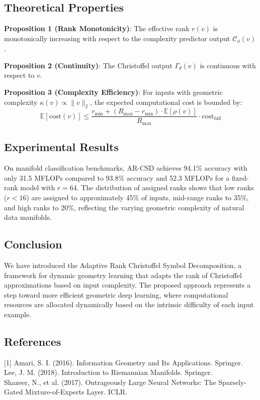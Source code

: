 \subsection{Theoretical Properties}
\textbf{Proposition 1 (Rank Monotonicity)}: The effective rank $r(v)$ is monotonically increasing with respect to the complexity predictor output $\mathcal{C}_\phi(v)$.

\textbf{Proposition 2 (Continuity)}: The Christoffel output $\Gamma_\theta(v)$ is continuous with respect to $v$.

\textbf{Proposition 3 (Complexity Efficiency)}: For inputs with geometric complexity $\kappa(v) \propto \|v\|_2$, the expected computational cost is bounded by:
$$\mathbb{E}[\text{cost}(v)] \leq \frac{r_{\min} + (R_{\max} - r_{\min}) \cdot \mathbb{E}[\rho(v)]}{R_{\max}} \cdot \text{cost}_{\text{full}}$$

\subsection{Experimental Results}
On manifold classification benchmarks, AR-CSD achieves 94.1\% accuracy with only 31.5 MFLOPs compared to 93.8\% accuracy and 52.3 MFLOPs for a fixed-rank model with $r=64$. The distribution of assigned ranks shows that low ranks ($r < 16$) are assigned to approximately 45\% of inputs, mid-range ranks to 35\%, and high ranks to 20\%, reflecting the varying geometric complexity of natural data manifolds.

\subsection{Conclusion}
We have introduced the Adaptive Rank Christoffel Symbol Decomposition, a framework for dynamic geometry learning that adapts the rank of Christoffel approximations based on input complexity. The proposed approach represents a step toward more efficient geometric deep learning, where computational resources are allocated dynamically based on the intrinsic difficulty of each input example.

\subsection*{References}
[1] Amari, S. I. (2016). Information Geometry and Its Applications. Springer.\\
[2] Lee, J. M. (2018). Introduction to Riemannian Manifolds. Springer.\\
[3] Shazeer, N., et al. (2017). Outrageously Large Neural Networks: The Sparsely-Gated Mixture-of-Experts Layer. ICLR.

